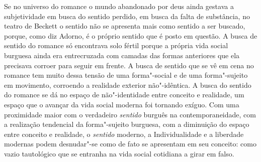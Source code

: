 Se no universo do romance o mundo abandonado por deus ainda gestava a
subjetividade em busca do sentido perdido, em busca da falta de
substância, no teatro de Beckett o sentido não se apresenta mais como
sentido a ser buscado, porque, como diz Adorno, é o próprio sentido que
é posto em questão. A busca de sentido do romance só encontrava solo
fértil porque a própria vida social burguesa ainda era entrecruzada com
camadas das formas anteriores que ela precisava corroer para seguir em
frente. A busca de sentido que se vê em cena no romance tem muito dessa
tensão de uma forma"-social e de uma forma"-sujeito em movimento,
corroendo a realidade exterior não"-idêntica. A busca do sentido do
romance se dá no espaço de não"-identidade entre conceito e realidade, um
espaço que o avançar da vida social moderna foi tornando exíguo. Com uma
proximidade maior com o verdadeiro \emph{sentido} burguês na
contemporaneidade, com a realização tendencial da forma"-sujeito
burguesa, com a diminuição do espaço entre conceito e realidade, o
\emph{sentido} moderno, a Individualidade e a liberdade modernas podem
desnudar"-se como de fato se apresentam em seu conceito: como vazio
tautológico que se entranha na vida social cotidiana a girar em falso.

